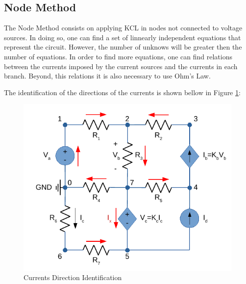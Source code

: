 \subsection{Node Method}
\label{subsec:Node Method}\par
The Node Method consists on applying KCL in nodes not connected to voltage sources. In doing so, one can find a set of linnearly independent equations that represent the circuit. However, the number of unknows will be greater then the number of equations. In order to find more equations, one can find relations between the currents imposed by the current sources and the currents in each branch. Beyond, this relations it is also necessary to use Ohm's Law.\par
The identification of the directions of the currents is shown bellow in Figure \ref{fig:NodeMethod}:


\begin{figure}[h] \centering
  \includegraphics[width=0.7\linewidth]{NodeMethod.pdf}
  \caption{Currents Direction Identification}
  \label{fig:NodeMethod}
\end{figure}

